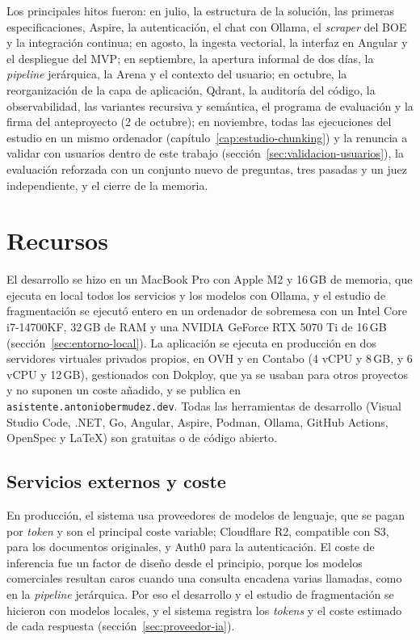 Los principales hitos fueron: en julio, la estructura de la solución, las primeras especificaciones, Aspire, la autenticación, el chat con Ollama, el \emph{scraper} del BOE y la integración continua; en agosto, la ingesta vectorial, la interfaz en Angular y el despliegue del MVP; en septiembre, la apertura informal de dos días, la \emph{pipeline} jerárquica, la Arena y el contexto del usuario; en octubre, la reorganización de la capa de aplicación, Qdrant, la auditoría del código, la observabilidad, las variantes recursiva y semántica, el programa de evaluación y la firma del anteproyecto (2 de octubre); en noviembre, todas las ejecuciones del estudio en un mismo ordenador (capítulo~\ref{cap:estudio-chunking}) y la renuncia a validar con usuarios dentro de este trabajo (sección~\ref{sec:validacion-usuarios}), la evaluación reforzada con un conjunto nuevo de preguntas, tres pasadas y un juez independiente, y el cierre de la memoria.

\section{Recursos}
\label{sec:recursos-detalle}

El desarrollo se hizo en un MacBook Pro con Apple M2 y 16\,GB de memoria, que ejecuta en local todos los servicios y los modelos con Ollama, y el estudio de fragmentación se ejecutó entero en un ordenador de sobremesa con un Intel Core i7-14700KF, 32\,GB de RAM y una NVIDIA GeForce RTX 5070 Ti de 16\,GB (sección~\ref{sec:entorno-local}). La aplicación se ejecuta en producción en dos servidores virtuales privados propios, en OVH y en Contabo (4 vCPU y 8\,GB, y 6 vCPU y 12\,GB), gestionados con Dokploy, que ya se usaban para otros proyectos y no suponen un coste añadido, y se publica en \texttt{asistente.antoniobermudez.dev}. Todas las herramientas de desarrollo (Visual Studio Code, .NET, Go, Angular, Aspire, Podman, Ollama, GitHub Actions, OpenSpec y \LaTeX) son gratuitas o de código abierto.

\subsection{Servicios externos y coste}

En producción, el sistema usa proveedores de modelos de lenguaje, que se pagan por \emph{token} y son el principal coste variable; Cloudflare R2, compatible con S3, para los documentos originales, y Auth0 para la autenticación. El coste de inferencia fue un factor de diseño desde el principio, porque los modelos comerciales resultan caros cuando una consulta encadena varias llamadas, como en la \emph{pipeline} jerárquica. Por eso el desarrollo y el estudio de fragmentación se hicieron con modelos locales, y el sistema registra los \emph{tokens} y el coste estimado de cada respuesta (sección~\ref{sec:proveedor-ia}).

